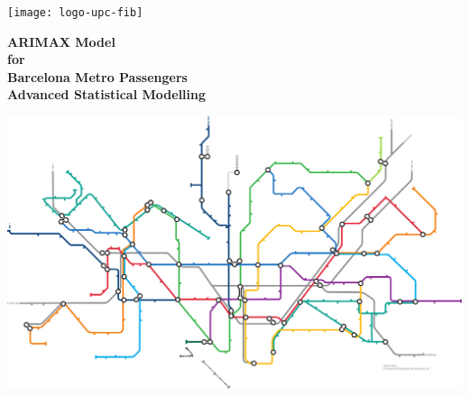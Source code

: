 
\thispagestyle{empty}
\clearpage
\setcounter{page}{-1}

\renewcommand\and{\\[\baselineskip]}

\makeatletter
\begin{titlepage}
{
    \centering
    \texttt{[image: logo-upc-fib]}
    \null%
    \vspace{3em}
    {\Huge \bfseries ARIMAX Model \\ for \\ Barcelona Metro Passengers \\[2em] \Large
    Advanced Statistical Modelling
    \par}
    \vspace{2em}
    {\large \scshape \@date{} \par}
    \vfill
    \includegraphics[width=\textwidth]{figures/metro_map_only_lines}
    \vfill
    {\raggedleft{} \large \bfseries \@author{} \par}
    \vspace{1em}
    \null%
}
\end{titlepage}
\makeatother
